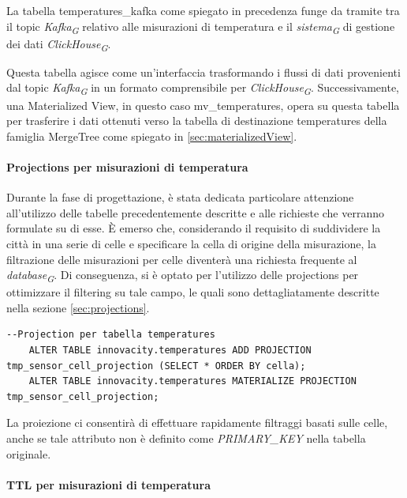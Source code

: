 La tabella temperatures\_kafka come spiegato in precedenza funge da tramite tra il topic \textit{Kafka}\textsubscript{\textit{G}} relativo alle misurazioni di temperatura e il \textit{sistema}\textsubscript{\textit{G}} di gestione dei dati \textit{ClickHouse}\textsubscript{\textit{G}}.

Questa tabella agisce come un'interfaccia trasformando i flussi di dati provenienti dal topic \textit{Kafka}\textsubscript{\textit{G}} in un formato comprensibile per \textit{ClickHouse}\textsubscript{\textit{G}}. Successivamente, una Materialized View, in questo caso mv\_temperatures, opera su questa tabella per trasferire i dati ottenuti verso la tabella di destinazione temperatures della famiglia MergeTree come spiegato in \ref{sec:materializedView}.
    
\paragraph{Projections per misurazioni di temperatura} \label{sec:temp_projections}

Durante la fase di progettazione, è stata dedicata particolare attenzione all'utilizzo delle tabelle precedentemente descritte e alle richieste che verranno formulate su di esse. È emerso che, considerando il requisito di suddividere la città in una serie di celle e specificare la cella di origine della misurazione, la filtrazione delle misurazioni per celle diventerà una richiesta frequente al \textit{database}\textsubscript{\textit{G}}. Di conseguenza, si è optato per l'utilizzo delle projections per ottimizzare il filtering su tale campo, le quali sono dettagliatamente descritte nella sezione \ref{sec:projections}.
\vspace{0,3cm}
\begin{lstlisting}[caption={implementazione projection tabella temperatures}, captionpos=b]
  --Projection per tabella temperatures
	ALTER TABLE innovacity.temperatures ADD PROJECTION tmp_sensor_cell_projection (SELECT * ORDER BY cella);
	ALTER TABLE innovacity.temperatures MATERIALIZE PROJECTION tmp_sensor_cell_projection;
\end{lstlisting}

La proiezione ci consentirà di effettuare rapidamente filtraggi basati sulle celle, anche se tale attributo non è definito come \textit{PRIMARY\_KEY} nella tabella originale.
      
\paragraph{TTL per misurazioni di temperatura} \label{sec:temp_TTL}

